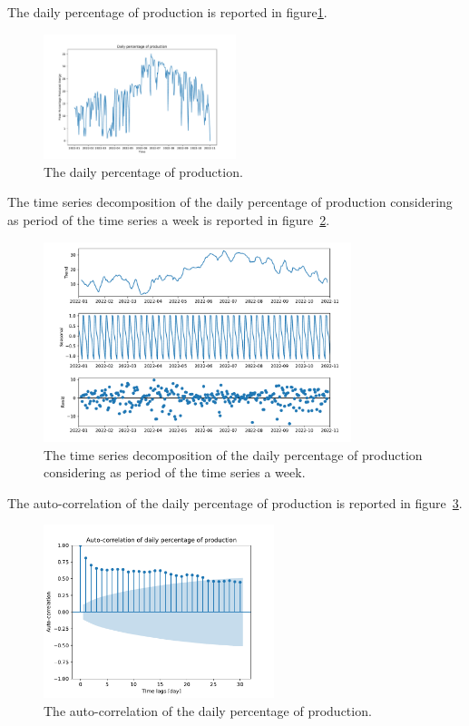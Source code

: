 The daily percentage of production is reported in figure\ref{fig:productiondataplotday}.

\begin{figure}[H]
\centering
\includegraphics[width=0.5\textwidth]{images/production/data_day_aggregated_plot}
\caption{The daily percentage of production.}
\label{fig:productiondataplotday}
\end{figure}

The time series decomposition of the daily percentage of production considering as period of the time series a week is reported in figure~\ref{fig:productiondecompositionday}. %

\begin{figure}[H]
\centering
\includegraphics[width=0.8\textwidth]{images/production/daily_aggregated_decomposition}
\caption{The time series decomposition of the daily percentage of production considering as period of the time series a week.}
\label{fig:productiondecompositionday}
\end{figure}

The auto-correlation of the daily percentage of production is reported in figure~\ref{fig:productioncorrelationday}. %

\begin{figure}[H]
\centering
\includegraphics[width=0.6\textwidth]{images/production/daily_aggregated_correlation}
\caption{The auto-correlation of the daily percentage of production.}
\label{fig:productioncorrelationday}
\end{figure}

